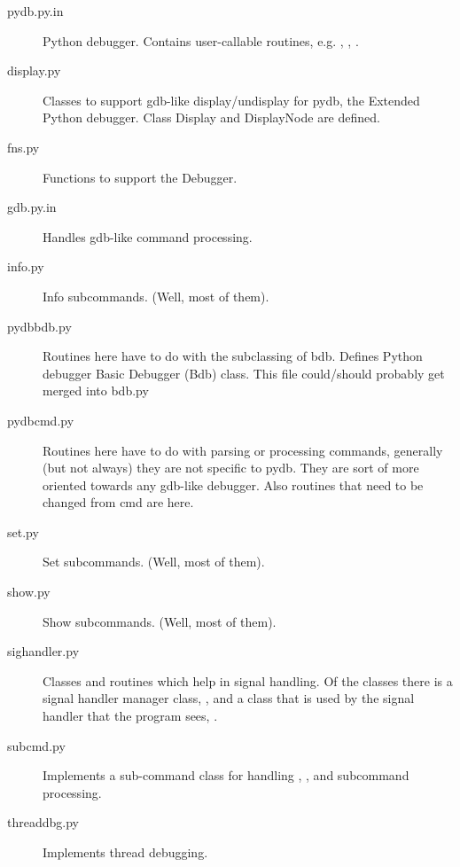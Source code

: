 \begin{description}
  
\item[pydb.py.in]
Python debugger. Contains user-callable routines, e.g. 
, , .

\item[display.py]

Classes to support gdb-like display/undisplay for pydb, the Extended
Python debugger. Class Display and DisplayNode are defined.

\item[fns.py]

Functions to support the Debugger.

\item[gdb.py.in]

Handles gdb-like command processing.

\item[info.py]

Info subcommands. (Well, most of them).

\item[pydbbdb.py]

Routines here have to do with the subclassing of bdb.  Defines Python
debugger Basic Debugger (Bdb) class.  This file could/should probably
get merged into bdb.py

\item[pydbcmd.py]

Routines here have to do with parsing or processing commands,
generally (but not always) they are not specific to pydb. They are sort
of more oriented towards any gdb-like debugger. Also routines that need to
be changed from cmd are here.

\item[set.py]

Set subcommands. (Well, most of them).

\item[show.py]

Show subcommands. (Well, most of them).

\item[sighandler.py]

Classes and routines which help in signal handling. Of the classes
there is a signal handler manager class, , and a
class that is used by the signal handler that the program sees,
.

\item[subcmd.py]

Implements a sub-command class for handling , ,
and  subcommand processing.

\item[threaddbg.py]

Implements thread debugging.

\end{description}

